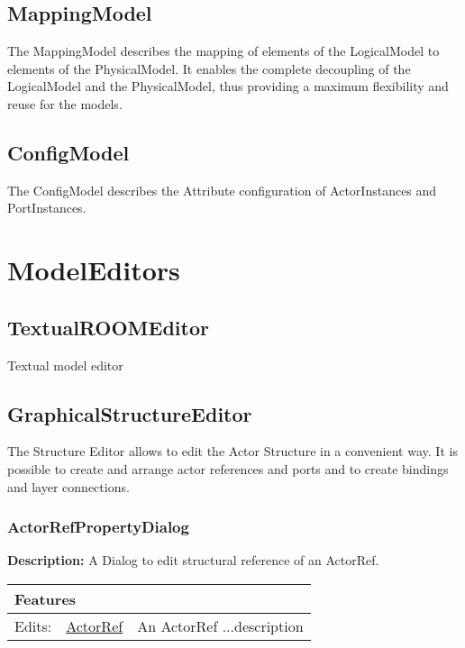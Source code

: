 		
		\subsection{\huge MappingModel}
		The MappingModel describes the mapping of elements of the LogicalModel to elements of the PhysicalModel. It enables the complete decoupling of the LogicalModel and the PhysicalModel, thus providing a maximum flexibility and reuse for the models.
	
		
		\subsection{\huge ConfigModel}
		The ConfigModel describes the Attribute configuration of ActorInstances and PortInstances. 
	
		
\section{\huge ModelEditors}
	
		\subsection{\huge TextualROOMEditor}
		Textual model editor
	
		
		\subsection{\huge GraphicalStructureEditor}
		The Structure Editor allows to edit the Actor Structure in a convenient way. It is possible to create and arrange actor references and ports and to create bindings and layer connections.
	
		
		
		\subsubsection{\huge ActorRefPropertyDialog}
			\hypertarget{ref:ActorRefPropertyDialog}{}
			
			\textbf{Description:} A Dialog to edit structural reference of an ActorRef.
			
			
			\begingroup
			\renewcommand{\arraystretch}{1.8} %
			\begin{longtable}{p{2.5cm}|p{4cm} p{}}
				\multicolumn{2}{l}{\textbf{\large Features}} & \\
				\hline
			Edits: & \tabitem \hyperlink{ref:ActorRef}{ActorRef}  & An ActorRef ...description\\
			\hline
			\end{longtable}
			\endgroup
			
